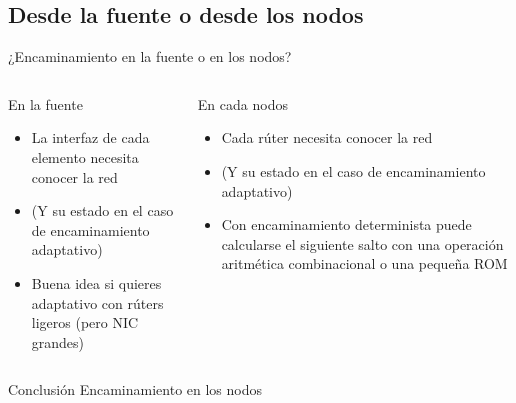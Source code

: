 \subsection{Desde la fuente o desde los nodos}
\begin{frame}{¿Encaminamiento en la fuente o en los nodos?}
    \begin{columns}
        \begin{column}{.5\textwidth}
            \begin{block}{En la fuente}
                \begin{itemize}
                    \item La interfaz de cada elemento necesita conocer la red
                    \item (Y su estado en el caso de encaminamiento adaptativo)
                    \item Buena idea si quieres adaptativo con rúters ligeros (pero NIC grandes)
                \end{itemize}
            \end{block}
        \end{column}%
        \begin{column}{.5\textwidth}
            \begin{block}{En cada nodos}
                \begin{itemize}
                    \item Cada rúter necesita conocer la red
                    \item (Y su estado en el caso de encaminamiento adaptativo)
                    \item Con encaminamiento determinista puede calcularse el siguiente salto con una operación aritmética combinacional o una pequeña ROM
                \end{itemize}    
            \end{block}
        \end{column}
    \end{columns}
    \begin{exampleblock}{Conclusión}
        Encaminamiento en los nodos
    \end{exampleblock}
\end{frame}